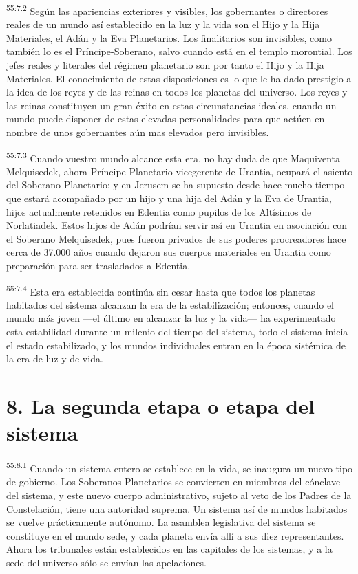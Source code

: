 \par
\textsuperscript{55:7.2} Según las apariencias exteriores y visibles, los gobernantes o directores reales de un mundo así establecido en la luz y la vida son el Hijo y la Hija Materiales, el Adán y la Eva Planetarios. Los finalitarios son invisibles, como también lo es el Príncipe-Soberano, salvo cuando está en el templo morontial. Los jefes reales y literales del régimen planetario son por tanto el Hijo y la Hija Materiales. El conocimiento de estas disposiciones es lo que le ha dado prestigio a la idea de los reyes y de las reinas en todos los planetas del universo. Los reyes y las reinas constituyen un gran éxito en estas circunstancias ideales, cuando un mundo puede disponer de estas elevadas personalidades para que actúen en nombre de unos gobernantes aún mas elevados pero invisibles.

\par
\textsuperscript{55:7.3} Cuando vuestro mundo alcance esta era, no hay duda de que Maquiventa Melquisedek, ahora Príncipe Planetario vicegerente de Urantia, ocupará el asiento del Soberano Planetario; y en Jerusem se ha supuesto desde hace mucho tiempo que estará acompañado por un hijo y una hija del Adán y la Eva de Urantia, hijos actualmente retenidos en Edentia como pupilos de los Altísimos de Norlatiadek. Estos hijos de Adán podrían servir así en Urantia en asociación con el Soberano Melquisedek, pues fueron privados de sus poderes procreadores hace cerca de 37.000 años cuando dejaron sus cuerpos materiales en Urantia como preparación para ser trasladados a Edentia.

\par
\textsuperscript{55:7.4} Esta era establecida continúa sin cesar hasta que todos los planetas habitados del sistema alcanzan la era de la estabilización; entonces, cuando el mundo más joven ---el último en alcanzar la luz y la vida--- ha experimentado esta estabilidad durante un milenio del tiempo del sistema, todo el sistema inicia el estado estabilizado, y los mundos individuales entran en la época sistémica de la era de luz y de vida.

\section*{8. La segunda etapa o etapa del sistema}
\par
\textsuperscript{55:8.1} Cuando un sistema entero se establece en la vida, se inaugura un nuevo tipo de gobierno. Los Soberanos Planetarios se convierten en miembros del cónclave del sistema, y este nuevo cuerpo administrativo, sujeto al veto de los Padres de la Constelación, tiene una autoridad suprema. Un sistema así de mundos habitados se vuelve prácticamente autónomo. La asamblea legislativa del sistema se constituye en el mundo sede, y cada planeta envía allí a sus diez representantes. Ahora los tribunales están establecidos en las capitales de los sistemas, y a la sede del universo sólo se envían las apelaciones.

